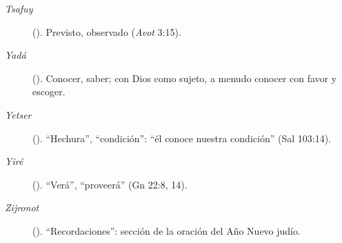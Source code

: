 \begin{description}
\item[\emph{Tsafuy}] (). Previsto, observado (\emph{Avot} 3:15).
\item[\emph{Yadá}] (). Conocer, saber; con Dios como sujeto, a menudo conocer con favor y escoger.
\item[\emph{Yetser}] (). ``Hechura'', ``condición'': ``él conoce nuestra condición'' (Sal 103:14).
\item[\emph{Yiré}] (). ``Verá'', ``proveerá'' (Gn 22:8, 14).
\item[\emph{Zijronot}] (). ``Recordaciones'': sección de la oración del Año Nuevo judío.
\end{description}

